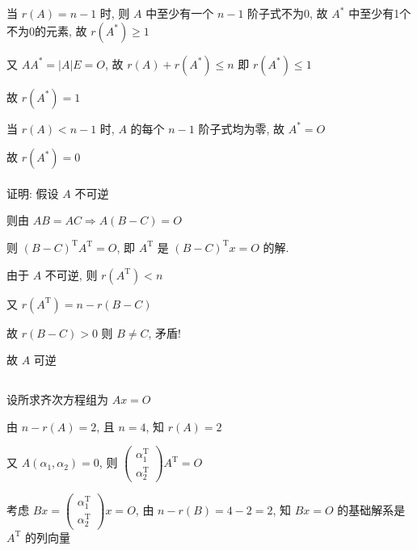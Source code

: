 		 当 \( r(A) = n-1 \) 时, 则 \( A \) 中至少有一个 \( n-1 \) 阶子式不为0, 故
		 \( A^{*} \) 中至少有1个不为0的元素, 故 \( r(A^{*}) \geq 1 \)

		 又 \( AA^{*} = |A|E = O \), 故 \( r(A)+r(A^{*}) \leq n \) 即 \( r(A^{*}) \leq 1 \)

		 故 \( r(A^{*}) = 1 \)

		 当 \( r(A) < n-1 \) 时, \( A \) 的每个 \( n-1 \) 阶子式均为零, 故 \( A^{*} = O \)

		 故 \( r(A^{*}) = 0 \)


	 \paragraph{} %
		 证明: 假设 \( A \) 不可逆

		 则由 \( AB = AC \Rightarrow A(B-C) = O \)

		 则 \( (B-C)^{\mathrm{T}}A^{\mathrm{T}} = O \), 即 \( A^{\mathrm{T}} \) 是 \( (B-C)^{\mathrm{T}}x = O \) 的解.

		 由于 \( A \) 不可逆, 则 \( r(A^{\mathrm{T}}) < n \)

		 又 \( r(A^{\mathrm{T}}) = n-r(B-C) \)

		 故 \( r(B-C) > 0 \) 则 \( B \neq C \), 矛盾!

		 故 \( A \) 可逆

 \subsection{} %


	 \paragraph{} %
		 设所求齐次方程组为 \( Ax = O \)

		 由 \( n - r(A) = 2 \), 且 \( n = 4 \), 知 \( r(A) = 2 \)

		 又 \( A(\alpha_{1}, \alpha_{2}) = 0 \), 则 \( \begin{pmatrix}
			 \alpha_{1}^{\mathrm{T}} \\
			 \alpha_{2}^{\mathrm{T}}
		 \end{pmatrix} A^{\mathrm{T}} = O \)

		 考虑 \( Bx = \begin{pmatrix}
			 \alpha_{1}^{\mathrm{T}} \\
			 \alpha_{2}^{\mathrm{T}}
		 \end{pmatrix} x = O \), 由 \( n - r(B) = 4 - 2 = 2 \), 知 \( Bx = O \) 的基础解系是 \( A^{\mathrm{T}} \) 的列向量

